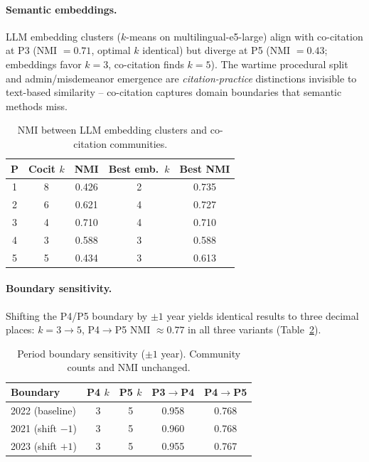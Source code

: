 \documentclass[11pt]{article}
\begin{document}
\paragraph{Semantic embeddings.}
LLM embedding clusters ($k$-means on multilingual-e5-large) align with co-citation at P3 (NMI $= 0.71$, optimal $k$ identical) but diverge at P5 (NMI $= 0.43$; embeddings favor $k=3$, co-citation finds $k=5$).
The wartime procedural split and admin/misdemeanor emergence are \emph{citation-practice} distinctions invisible to text-based similarity -- co-citation captures domain boundaries that semantic methods miss.

\begin{table}[t]
\centering
\small
\caption{NMI between LLM embedding clusters and co-citation communities.}
\label{tab:embeddings}
\begin{tabular}{@{}ccccc@{}}
\toprule
\textbf{P} & \textbf{Cocit $k$} & \textbf{NMI} & \textbf{Best emb.\ $k$} & \textbf{Best NMI} \\
\midrule
1 & 8 & 0.426 & 2 & 0.735 \\
2 & 6 & 0.621 & 4 & 0.727 \\
3 & 4 & 0.710 & 4 & 0.710 \\
4 & 3 & 0.588 & 3 & 0.588 \\
5 & 5 & 0.434 & 3 & 0.613 \\
\bottomrule
\end{tabular}
\end{table}

\paragraph{Boundary sensitivity.}
Shifting the P4/P5 boundary by $\pm 1$ year yields identical results to three decimal places: $k = 3 \to 5$, P4$\to$P5 NMI $\approx 0.77$ in all three variants (Table~\ref{tab:boundary}).

\begin{table}[t]
\centering
\small
\caption{Period boundary sensitivity ($\pm 1$ year). Community counts and NMI unchanged.}
\label{tab:boundary}
\begin{tabular}{@{}lcccc@{}}
\toprule
\textbf{Boundary} & \textbf{P4 $k$} & \textbf{P5 $k$} & \textbf{P3$\to$P4} & \textbf{P4$\to$P5} \\
\midrule
2022 (baseline) & 3 & 5 & 0.958 & 0.768 \\
2021 (shift $-1$) & 3 & 5 & 0.960 & 0.768 \\
2023 (shift $+1$) & 3 & 5 & 0.955 & 0.767 \\
\bottomrule
\end{tabular}
\end{table}
\end{document}
